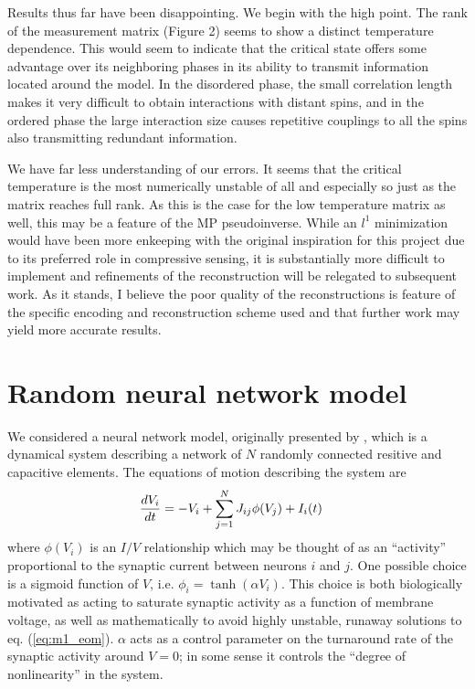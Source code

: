 \documentclass{article} %
\begin{document}
Results thus far have been disappointing.  We begin with the high point.  The
rank of the measurement matrix (Figure 2) seems to show a distinct temperature
dependence.
This would seem to indicate that the critical state offers some advantage over its
neighboring phases in its ability to transmit information located around the model.
In the disordered phase, the small correlation length makes it very difficult to
obtain interactions with distant spins, and in the ordered phase the large interaction
size causes repetitive couplings to all the spins also transmitting redundant information.

We have far less understanding of our errors.  It seems that the critical temperature
is the most numerically unstable of all and especially so just as the matrix reaches
full rank.  As this is the case for the low temperature matrix as well, this may be
a feature of the MP pseudoinverse.  While an $l^1$ minimization would have been more
enkeeping with the original inspiration for this project due to its preferred role
in compressive sensing, it is substantially more difficult to implement and refinements
of the reconstruction will be relegated to subsequent work. As it stands, I believe
the poor quality of the reconstructions is feature of the specific encoding and 
reconstruction scheme used and that further work may yield more accurate results.


\section{Random neural network model}
We considered a neural network model, originally presented by \cite{Sompolinsky1988}, which is a dynamical system describing a network of $N$ randomly connected resitive and capacitive elements.  The equations of motion describing the system are
\begin{align}
	\frac{d V_i}{d t} &= -V_i + \sum_{j=1}^{N} J_{ij} \phi(V_j) \label{eq:m1_eom} + I_i(t)
\end{align}
where $\phi(V_i)$ is an $I/V$ relationship which may be thought of as an ``activity'' proportional to the synaptic current between neurons $i$ and $j$.    One possible choice is a sigmoid function of $V$, i.e. $\phi_i = \tanh\left(\alpha V_i\right)$.  This choice is both biologically motivated as acting to saturate synaptic activity as a function of membrane voltage, as well as mathematically to avoid highly unstable, runaway solutions to eq. (\ref{eq:m1_eom}).  $\alpha$ acts as a control parameter on the turnaround rate of the synaptic activity around $V = 0$; in some sense it controls the ``degree of nonlinearity'' in the system.
\end{document}
